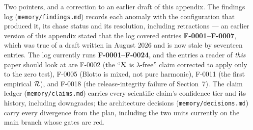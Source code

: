 Two pointers, and a correction to an earlier draft of this appendix. The
findings log (\texttt{memory/findings.md}) records each anomaly with the
configuration that produced it, its chase status and its resolution, including
retractions --- an earlier version of this appendix stated that the log covered
entries \textbf{F-0001--F-0007}, which was true of a draft written in August
2026 and is now stale by seventeen entries. The log currently runs
\textbf{F-0001--F-0024}, and the entries a reader of \emph{this} paper should
look at are F-0002 (the ``$\mathcal{R}$ is $\lambda$-free'' claim corrected to apply only
to the zero test), F-0005 (Blotto is mixed, not pure harmonic), F-0011 (the
first empirical $\mathcal{R}$), and F-0018 (the release-integrity failure of
Section~7). The claim ledger (\texttt{memory/claims.md}) carries every
scientific claim's confidence tier and its history, including downgrades; the
architecture decisions (\texttt{memory/decisions.md}) carry every divergence
from the plan, including the two units currently on the main branch whose gates
are red.
